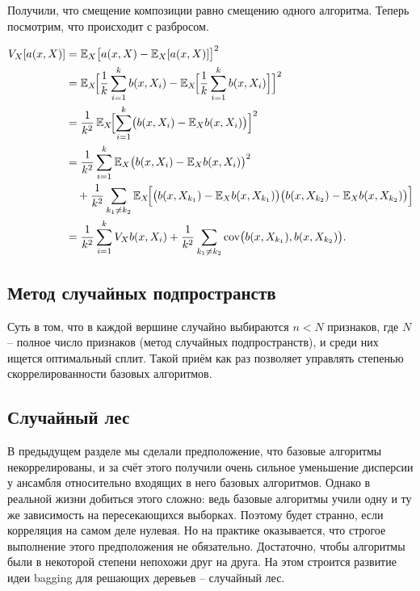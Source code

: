 Получили, что смещение композиции равно смещению одного алгоритма.
Теперь посмотрим, что происходит с разбросом.

\begin{align*}
    V_X[a(x,X)] &= \mathbb{E}_X\bigl[a(x,X) - \mathbb{E}_X[a(x,X)]\bigr]^2 \\
    &= \mathbb{E}_X\!\Bigl[\frac{1}{k}\sum_{i=1}^k b(x,X_i) - \mathbb{E}_X\!\Bigl[\frac{1}{k}\sum_{i=1}^k b(x,X_i)
    \Bigr]\Bigr]^2 \\
    &= \frac{1}{k^2}\,\mathbb{E}_X\!\Bigl[\sum_{i=1}^k \bigl(b(x,X_i) - \mathbb{E}_X b(x,X_i)\bigr)\Bigr]^2 \\
    &= \frac{1}{k^2}\sum_{i=1}^k \mathbb{E}_X\bigl(b(x,X_i) - \mathbb{E}_X b(x,X_i)\bigr)^2 \\
    &\quad + \frac{1}{k^2}\sum_{k_1\neq k_2} \mathbb{E}_X\!\Bigl[\bigl(b(x,X_{k_1}) - \mathbb{E}_X b(x,X_{k_1})
    \bigr)\bigl(b(x,X_{k_2}) - \mathbb{E}_X b(x,X_{k_2})\bigr)\Bigr] \\
    &= \frac{1}{k^2}\sum_{i=1}^k V_X b(x,X_i) + \frac{1}{k^2}\sum_{k_1\neq k_2} \operatorname{cov}
    \bigl(b(x,X_{k_1}), b(x,X_{k_2})\bigr).
\end{align*}

\subsection{Метод случайных подпространств}

Суть в том, что в каждой вершине случайно выбираются $n<N$ признаков, где $N$ -- полное число признаков
(метод случайных подпространств), и среди них ищется оптимальный сплит.
Такой приём как раз позволяет управлять степенью скоррелированности базовых алгоритмов.

\subsection{Случайный лес}

В предыдущем разделе мы сделали предположение, что базовые алгоритмы некоррелированы, и за счёт этого получили очень
сильное уменьшение дисперсии у ансамбля относительно входящих в него базовых алгоритмов.
Однако в реальной жизни добиться этого сложно: ведь базовые алгоритмы учили одну и ту же зависимость на
пересекающихся выборках.
Поэтому будет странно, если корреляция на самом деле нулевая.
Но на практике оказывается, что строгое выполнение этого предположения не обязательно.
Достаточно, чтобы алгоритмы были в некоторой степени непохожи друг на друга.
На этом строится развитие идеи bagging для решающих деревьев -- случайный лес.

